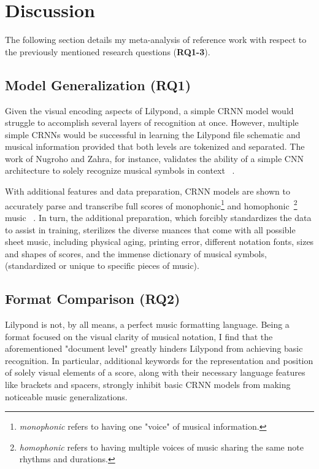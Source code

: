 \documentclass[sigconf]{acmart}
\begin{document}
\section{Discussion}

The following section details my meta-analysis of reference work with respect to the previously mentioned research questions (\textbf{RQ1-3}).

\subsection{Model Generalization (RQ1)}
Given the visual encoding aspects of Lilypond, a simple CRNN model would struggle to accomplish several layers of recognition at once.
However, multiple simple CRNNs would be successful in learning the Lilypond file schematic and musical information provided that both levels are tokenized and separated.
The work of Nugroho and Zahra, for instance, validates the ability of a simple CNN architecture to solely recognize musical symbols in context ~\cite{nugroho_zahra_2024}.

With additional features and data preparation, CRNN models are shown to accurately parse and transcribe full scores of monophonic\footnote{\textit{monophonic} refers to having one "voice" of musical information.} and homophonic~\footnote{\textit{homophonic} refers to having multiple voices of music sharing the same note rhythms and durations.} music ~\cite{contreras2023omrcnn}.
In turn, the additional preparation, which forcibly standardizes the data to assist in training, sterilizes the diverse nuances that come with all possible sheet music, 
including physical aging, printing error, different notation fonts, sizes and shapes of scores, and the immense dictionary of musical symbols, (standardized or unique to specific pieces of music).

\subsection{Format Comparison (RQ2)}
Lilypond is not, by all means, a perfect music formatting language. 
Being a format focused on the visual clarity of musical notation, I find that the aforementioned "document level" greatly hinders Lilypond from achieving basic recognition.
In particular, additional keywords for the representation and position of solely visual elements of a score, 
along with their necessary language features like brackets and spacers, strongly inhibit basic CRNN models from making noticeable music generalizations.
\end{document}
